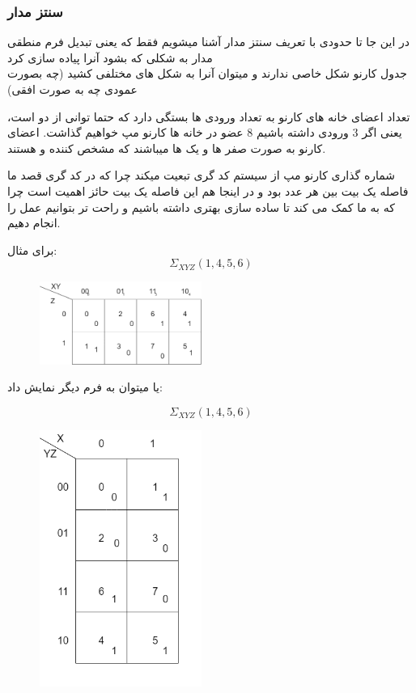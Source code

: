 \documentclass[20pt, a4paper]{article}
\begin{document}
\subsubsection{سنتز مدار}
در این جا تا حدودی با تعریف سنتز مدار آشنا میشویم فقط که یعنی تبدیل فرم منطقی مدار به شکلی که بشود آنرا پیاده سازی کرد\\

جدول کارنو شکل خاصی ندارند و میتوان آنرا به شکل های مختلفی کشید
(چه بصورت عمودی چه به صورت افقی)

تعداد اعضای خانه های کارنو به تعداد ورودی ها بستگی دارد که حتما توانی از دو است، یعنی اگر
3
ورودی داشته باشیم 8 عضو در خانه ها کارنو مپ خواهیم گذاشت.
اعضای کارنو به صورت صفر ها و یک ها میباشند که مشخص کننده 
و
هستند.


شماره گذاری کارنو مپ از سیستم کد گری تبعیت میکند چرا که در کد گری قصد ما فاصله یک بیت
بین هر عدد بود و در اینجا هم این فاصله یک بیت حائز اهمیت است چرا که به ما کمک می کند
تا ساده سازی بهتری داشته باشیم و راحت تر بتوانیم عمل 
را انجام دهیم.

برای مثال:\\

\begin{equation}
	\Sigma_{XYZ}(1, 4, 5, 6)
\end{equation}

\begin{figure}[htbp]\centering
	\centerline{\includegraphics[width=150pt]{img/karnoughMap/k1.png}}
\end{figure}
یا میتوان به فرم دیگر نمایش داد:

\begin{equation}
	\Sigma_{XYZ}(1, 4, 5, 6)
\end{equation}

\begin{figure}[htbp]\centering
	\centerline{\includegraphics[width=150pt]{img/karnoughMap/k2.png}}
\end{figure}
\end{document}
